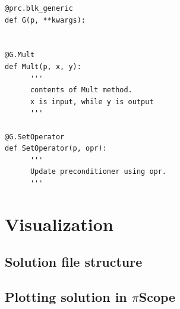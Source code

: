 \documentclass[11pt,a4paper,final]{report}
\begin{document}
\begin{minipage}[c]{0.95\textwidth}
\begin{lstlisting}[caption={A user defined generic preconditioner},captionpos=b, frame=single, label={prc3}]
@prc.blk_generic
def G(p, **kwargs):


@G.Mult
def Mult(p, x, y):
      '''
      contents of Mult method. 
      x is input, while y is output
      '''

@G.SetOperator
def SetOperator(p, opr):
      '''
      Update preconditioner using opr.
      '''
\end{lstlisting}
 \end{minipage}




\chapter{Visualization}
\section{Solution file structure}
\section{Plotting solution in $\pi$Scope}
\end{document}
